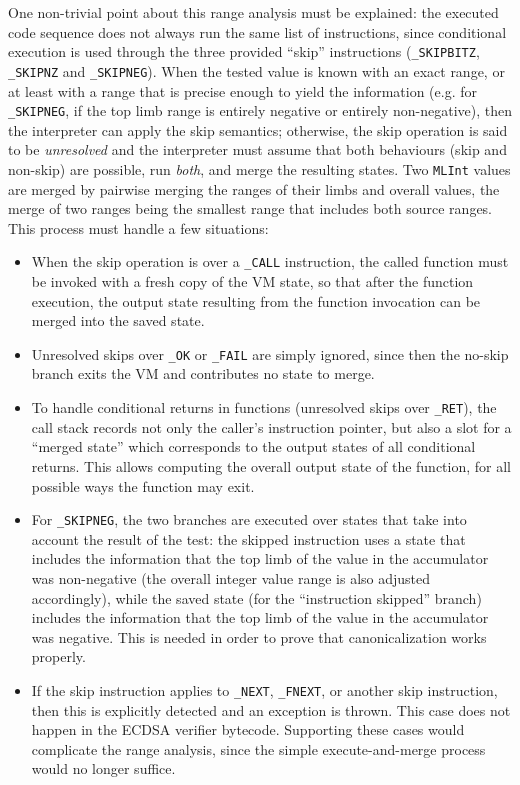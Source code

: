 \documentclass{llncs}
\begin{document}
One non-trivial point about this range analysis must be explained: the
executed code sequence does not always run the same list of
instructions, since conditional execution is used through the three
provided ``skip'' instructions (\verb+_SKIPBITZ+, \verb+_SKIPNZ+ and
\verb+_SKIPNEG+). When the tested value is known with an exact range, or
at least with a range that is precise enough to yield the information
(e.g. for \verb+_SKIPNEG+, if the top limb range is entirely negative or
entirely non-negative), then the interpreter can apply the skip
semantics; otherwise, the skip operation is said to be \emph{unresolved}
and the interpreter must assume that both behaviours (skip and non-skip)
are possible, run \emph{both}, and merge the resulting states. Two
\verb+MLInt+ values are merged by pairwise merging the ranges of their
limbs and overall values, the merge of two ranges being the smallest
range that includes both source ranges. This process must handle a few
situations:
\begin{itemize}

    \item When the skip operation is over a \verb+_CALL+ instruction,
    the called function must be invoked with a fresh copy of the
    VM state, so that after the function execution, the output state
    resulting from the function invocation can be merged into the
    saved state.

    \item Unresolved skips over \verb+_OK+ or \verb+_FAIL+ are simply
    ignored, since then the no-skip branch exits the VM and contributes
    no state to merge.

    \item To handle conditional returns in functions (unresolved skips
    over \verb+_RET+), the call stack records not only the caller's
    instruction pointer, but also a slot for a ``merged state'' which
    corresponds to the output states of all conditional returns. This
    allows computing the overall output state of the function, for all
    possible ways the function may exit.

    \item For \verb+_SKIPNEG+, the two branches are executed over states
    that take into account the result of the test: the skipped instruction
    uses a state that includes the information that the top limb of the
    value in the accumulator was non-negative (the overall integer value
    range is also adjusted accordingly), while the saved state (for the
    ``instruction skipped'' branch) includes the information that the top
    limb of the value in the accumulator was negative. This is needed in
    order to prove that canonicalization works properly.

    \item If the skip instruction applies to \verb+_NEXT+,
    \verb+_FNEXT+, or another skip instruction, then this is explicitly
    detected and an exception is thrown. This case does not happen in
    the ECDSA verifier bytecode. Supporting these cases would complicate
    the range analysis, since the simple execute-and-merge process would
    no longer suffice.

\end{itemize}
\end{document}
